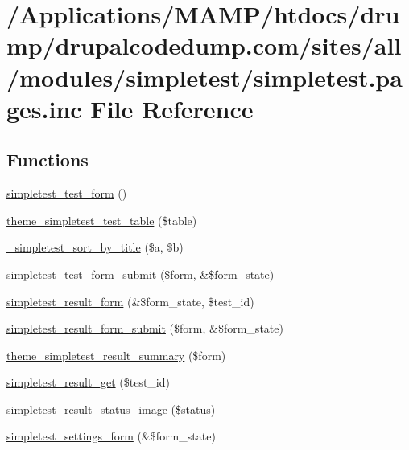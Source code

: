 \hypertarget{simpletest_8pages_8inc}{
\section{/Applications/MAMP/htdocs/drump/drupalcodedump.com/sites/all/modules/simpletest/simpletest.pages.inc File Reference}
\label{simpletest_8pages_8inc}
}
\subsection*{Functions}
\begin{DoxyCompactItemize}
\item 
\hyperlink{simpletest_8pages_8inc_ab617b800aa9c77c9456131e0beb65bef}{simpletest\_\-test\_\-form} ()
\item 
\hyperlink{simpletest_8pages_8inc_aa6be38ebfa5a4fb31f3e786c3e4aa415}{theme\_\-simpletest\_\-test\_\-table} (\$table)
\item 
\hyperlink{simpletest_8pages_8inc_a2fd122eb416ff956a0856b771a0e2650}{\_\-simpletest\_\-sort\_\-by\_\-title} (\$a, \$b)
\item 
\hyperlink{simpletest_8pages_8inc_ae93012096feaf92ea177eaf496e51356}{simpletest\_\-test\_\-form\_\-submit} (\$form, \&\$form\_\-state)
\item 
\hyperlink{simpletest_8pages_8inc_aa718f24f482932ac038c6ed8f4a0f082}{simpletest\_\-result\_\-form} (\&\$form\_\-state, \$test\_\-id)
\item 
\hyperlink{simpletest_8pages_8inc_aa49754acf61555f23482a0257db56da2}{simpletest\_\-result\_\-form\_\-submit} (\$form, \&\$form\_\-state)
\item 
\hyperlink{simpletest_8pages_8inc_a367c96f8ea59a3c5b7e45a27fc420779}{theme\_\-simpletest\_\-result\_\-summary} (\$form)
\item 
\hyperlink{simpletest_8pages_8inc_a36d253fe9ff7de21a484f1bb0ff9b5a6}{simpletest\_\-result\_\-get} (\$test\_\-id)
\item 
\hyperlink{simpletest_8pages_8inc_a113abd1a787e904816f29e409b4385ea}{simpletest\_\-result\_\-status\_\-image} (\$status)
\item 
\hyperlink{simpletest_8pages_8inc_a7ed68a2cea79c9d146dc370b3787defd}{simpletest\_\-settings\_\-form} (\&\$form\_\-state)
\end{DoxyCompactItemize}


